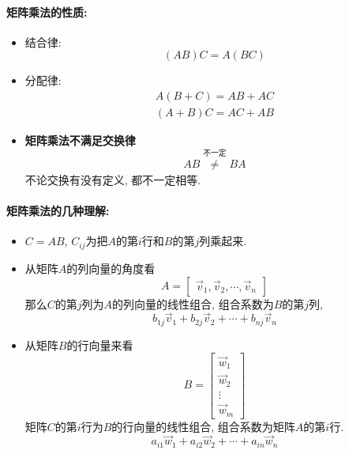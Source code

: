 \paragraph{矩阵乘法的性质:}
\begin{itemize}
    \item 结合律:\begin{equation}
    \left( AB \right) C =A\left( BC \right) 
    \end{equation}
    \item 分配律:\begin{align}
  A\left( B+C \right) = AB+AC
  \\
  \left( A+B \right) C = AC+AB
\end{align}
    \item \textbf{矩阵乘法不满足交换律}\begin{equation}
  AB \mathop{\neq }\limits^{\text{不一定}}_{} BA
\end{equation}不论交换有没有定义, 都不一定相等.
\end{itemize}



\paragraph{矩阵乘法的几种理解:}
\begin{itemize}
    \item $C=AB$, $C_{ij}$为把$A$的第$i$行和$B$的第$j$列乘起来.
    
    \item 从矩阵$A$的列向量的角度看
    \begin{equation}
        A=\begin{bmatrix} \vec{v}_1, \vec{v}_2, \cdots, \vec{v}_n \end{bmatrix}
    \end{equation}
    那么$C$的第$j$列为$A$的列向量的线性组合, 组合系数为$B$的第$j$列,
    \begin{equation}
      b_{1j}\vec{v}_1 + b_{2j}\vec{v}_2+ \cdots + b_{nj}\vec{v}_n
    \end{equation}

    \item 从矩阵$B$的行向量来看
    \begin{equation}
      B = \begin{bmatrix} \vec{w}_1 \\ \vec{w}_2 \\ \vdots \\ \vec{w}_m \end{bmatrix}
    \end{equation}
    矩阵$C$的第$i$行为$B$的行向量的线性组合, 组合系数为矩阵$A$的第$i$行.
    \begin{equation}
      a_{i1}\vec{w}_1 + a_{i 2}\vec{w}_2 + \cdots +a_{in}\vec{w}_n
    \end{equation}
\end{itemize}


